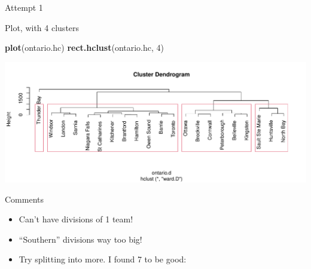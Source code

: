 \documentclass[
  ignorenonframetext,
]{beamer}
\newenvironment{Shaded}{\begin{snugshade}}{\end{snugshade}}
\newcommand{\DataTypeTok}[1]{\textcolor[rgb]{0.13,0.29,0.53}{#1}}
\newcommand{\DecValTok}[1]{\textcolor[rgb]{0.00,0.00,0.81}{#1}}
\newcommand{\KeywordTok}[1]{\textcolor[rgb]{0.13,0.29,0.53}{\textbf{#1}}}
\newcommand{\NormalTok}[1]{#1}
\newcommand{\OperatorTok}[1]{\textcolor[rgb]{0.81,0.36,0.00}{\textbf{#1}}}
\newcommand{\StringTok}[1]{\textcolor[rgb]{0.31,0.60,0.02}{#1}}
\begin{document}
\begin{frame}[fragile]{Attempt 1}
\protect\hypertarget{attempt-1}{}

\begin{Shaded}
\end{Shaded}

\end{frame}

\begin{frame}[fragile]{Plot, with 4 clusters}
\protect\hypertarget{plot-with-4-clusters}{}

\begin{Shaded}
\begin{Highlighting}[]
\KeywordTok{plot}\NormalTok{(ontario.hc)}
\KeywordTok{rect.hclust}\NormalTok{(ontario.hc, }\DecValTok{4}\NormalTok{)}
\end{Highlighting}
\end{Shaded}

\includegraphics{slides_d29_files/figure-beamer/unnamed-chunk-418-1.pdf}

\end{frame}

\begin{frame}{Comments}
\protect\hypertarget{comments-28}{}

\begin{itemize}
\item
  Can't have divisions of 1 team!
\item
  ``Southern'' divisions way too big!
\item
  Try splitting into more. I found 7 to be good:
\end{itemize}

\end{frame}
\end{document}

